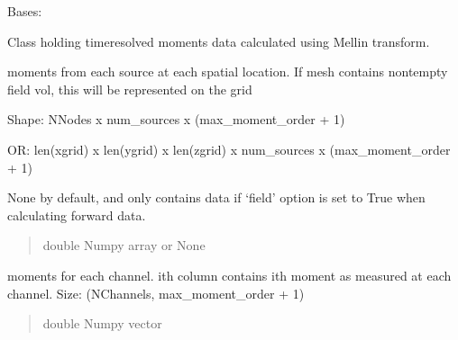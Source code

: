 \documentclass[letterpaper,10pt,english]{sphinxmanual}
\begin{document}
\begin{fulllineitems}
\label{\detokenize{_autosummary/nirfasterff.base.data.TRMomentsdata:nirfasterff.base.data.TRMomentsdata}}
\pysigstartsignatures
\pysigline
{}
\pysigstopsignatures
\sphinxAtStartPar
Bases: 

\sphinxAtStartPar
Class holding time\sphinxhyphen{}resolved moments data calculated using Mellin transform.

\begin{fulllineitems}
\label{\detokenize{_autosummary/nirfasterff.base.data.TRMomentsdata:nirfasterff.base.data.TRMomentsdata.phi}}
\pysigstartsignatures
\pysigline
{}
\pysigstopsignatures
\sphinxAtStartPar
moments from each source at each spatial location. If mesh contains non\sphinxhyphen{}tempty field vol, this will be represented on the grid

\sphinxAtStartPar
Shape: NNodes x num\_sources x (max\_moment\_order + 1)

\sphinxAtStartPar
OR: len(xgrid) x len(ygrid) x len(zgrid) x num\_sources x (max\_moment\_order + 1)

\sphinxAtStartPar
None by default, and only contains data if ‘field’ option is set to True when calculating forward data.
\begin{quote}\begin{description}
\sphinxAtStartPar
double Numpy array or None

\end{description}\end{quote}

\end{fulllineitems}


\begin{fulllineitems}
\label{\detokenize{_autosummary/nirfasterff.base.data.TRMomentsdata:nirfasterff.base.data.TRMomentsdata.moments}}
\pysigstartsignatures
\pysigline
{}
\pysigstopsignatures
\sphinxAtStartPar
moments for each channel. i\sphinxhyphen{}th column contains i\sphinxhyphen{}th moment as measured at each channel. Size: (NChannels, max\_moment\_order + 1)
\begin{quote}\begin{description}
\sphinxAtStartPar
double Numpy vector


\end{description}
\end{quote}
\end{fulllineitems}
\end{fulllineitems}
\end{document}
